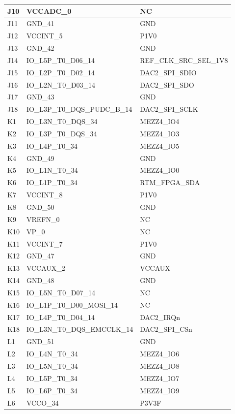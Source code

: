 \begin{footnotesize}
\begin{longtable}{|l|p{6cm}|p{6cm}|}
J10	&	VCCADC\_0	&	NC	\\ \hline
J11	&	GND\_41	&	GND	\\ \hline
J12	&	VCCINT\_5	&	P1V0	\\ \hline
J13	&	GND\_42	&	GND	\\ \hline
J14	&	IO\_L5P\_T0\_D06\_14	&	REF\_CLK\_SRC\_SEL\_1V8	\\ \hline
J15	&	IO\_L2P\_T0\_D02\_14	&	DAC2\_SPI\_SDIO	\\ \hline
J16	&	IO\_L2N\_T0\_D03\_14	&	DAC2\_SPI\_SDO	\\ \hline
J17	&	GND\_43	&	GND	\\ \hline
J18	&	IO\_L3P\_T0\_DQS\_PUDC\_B\_14	&	DAC2\_SPI\_SCLK	\\ \hline
K1	&	IO\_L3N\_T0\_DQS\_34	&	MEZZ4\_IO4	\\ \hline
K2	&	IO\_L3P\_T0\_DQS\_34	&	MEZZ4\_IO3	\\ \hline
K3	&	IO\_L4P\_T0\_34	&	MEZZ4\_IO5	\\ \hline
K4	&	GND\_49	&	GND	\\ \hline
K5	&	IO\_L1N\_T0\_34	&	MEZZ4\_IO0	\\ \hline
K6	&	IO\_L1P\_T0\_34	&	RTM\_FPGA\_SDA	\\ \hline
K7	&	VCCINT\_8	&	P1V0	\\ \hline
K8	&	GND\_50	&	GND	\\ \hline
K9	&	VREFN\_0	&	NC	\\ \hline
K10	&	VP\_0	&	NC	\\ \hline
K11	&	VCCINT\_7	&	P1V0	\\ \hline
K12	&	GND\_47	&	GND	\\ \hline
K13	&	VCCAUX\_2	&	VCCAUX	\\ \hline
K14	&	GND\_48	&	GND	\\ \hline
K15	&	IO\_L5N\_T0\_D07\_14	&	NC	\\ \hline
K16	&	IO\_L1P\_T0\_D00\_MOSI\_14	&	NC	\\ \hline
K17	&	IO\_L4P\_T0\_D04\_14	&	DAC2\_IRQn	\\ \hline
K18	&	IO\_L3N\_T0\_DQS\_EMCCLK\_14	&	DAC2\_SPI\_CSn	\\ \hline
L1	&	GND\_51	&	GND	\\ \hline
L2	&	IO\_L4N\_T0\_34	&	MEZZ4\_IO6	\\ \hline
L3	&	IO\_L5N\_T0\_34	&	MEZZ4\_IO8	\\ \hline
L4	&	IO\_L5P\_T0\_34	&	MEZZ4\_IO7	\\ \hline
L5	&	IO\_L6P\_T0\_34	&	MEZZ4\_IO9	\\ \hline
L6	&	VCCO\_34	&	P3V3F	\\ \hline

\end{longtable}
\end{footnotesize}
